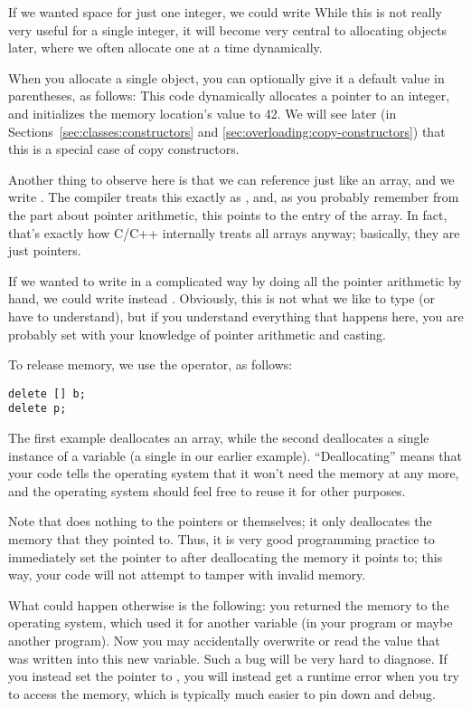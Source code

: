If we wanted space for just one integer, we could write
While this is not really very useful for a single integer,
it will become very central to allocating objects later,
where we often allocate one at a time dynamically.

When you allocate a single object, you can optionally give it a
default value in parentheses, as follows:
This code dynamically allocates a pointer to an integer,
and initializes the memory location's value to 42.
We will see later (in Sections~\ref{sec:classes:constructors} and
\ref{sec:overloading:copy-constructors}) that this is a special case
of copy constructors.

Another thing to observe here is that we can reference  just
like an array, and we write .
The compiler treats this exactly as , and, as you
probably remember from the part about pointer arithmetic, this points
to the  entry of the array.
In fact, that's exactly how C/C++ internally treats all arrays anyway;
basically, they are just pointers.

If we wanted to write  in a complicated way by doing all
the pointer arithmetic by hand, we could write instead
.
Obviously, this is not what we like to type (or have to understand),
but if you understand everything that happens here, you are probably
set with your knowledge of pointer arithmetic and casting.

\smallskip

To release memory, we use the  operator, as follows:
\begin{verbatim}
delete [] b;
delete p;
\end{verbatim}
The first example deallocates an array,
while the second deallocates a single instance of a variable
(a single  in our earlier example).
``Deallocating'' means that your code tells the operating system that
it won't need the memory at  any more, and the operating
system should feel free to reuse it for other purposes.

Note that  does nothing to the pointers  or
 themselves;
it only deallocates the memory that they pointed to.
Thus, it is very good programming practice to immediately set the
pointer to  after deallocating the memory it points to;
this way, your code will not attempt to tamper with invalid memory.

What could happen otherwise is the following:
you returned the memory to the operating system, which used it for
another variable (in your program or maybe another program).
Now you may accidentally overwrite or read the value that was written
into this new variable. Such a bug will be very hard to diagnose.
If you instead set the pointer to , you will instead get
a runtime error when you try to access the memory,
which is typically much easier to pin down and debug.

